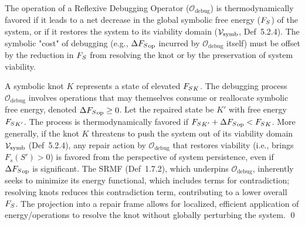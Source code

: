 \begin{theorem}
\label{theorem:bk8_observer_projection_tensor}
The operation of a Reflexive Debugging Operator ($\mathcal{O}_{\text{debug}}$) is thermodynamically favored if it leads to a net decrease in the global symbolic free energy ($F_S$) of the system, or if it restores the system to its viability domain ($\mathcal{V}_{\mathrm{symb}}$, Def~5.2.4). The symbolic "cost" of debugging (e.g., $\Delta {F_S}_{\text{op}}$ incurred by $\mathcal{O}_{\text{debug}}$ itself) must be offset by the reduction in $F_S$ from resolving the knot or by the preservation of system viability.
\end{theorem}
\begin{demonstratio}
\label{demonstratio:bk8_symbolic_unkotting}
A symbolic knot $K$ represents a state of elevated ${F_S}_K$. The debugging process $\mathcal{O}_{\text{debug}}$ involves operations that may themselves consume or reallocate symbolic free energy, denoted $\Delta {F_S}_{\text{op}} \ge 0$. Let the repaired state be $K'$ with free energy ${F_S}_{K'}$. The process is thermodynamically favored if ${F_S}_{K'} + \Delta {F_S}_{\text{op}} < {F_S}_K$.
More generally, if the knot $K$ threatens to push the system out of its viability domain $\mathcal{V}_{\mathrm{symb}}$ (Def~5.2.4), any repair action by $\mathcal{O}_{\text{debug}}$ that restores viability (i.e., brings $F_s(S') > 0$) is favored from the perspective of system persistence, even if $\Delta {F_S}_{\text{op}}$ is significant.
The SRMF (Def~1.7.2), which underpins $\mathcal{O}_{\text{debug}}$, inherently seeks to minimize its energy functional, which includes terms for contradiction; resolving knots reduces this contradiction term, contributing to a lower overall ${F_S}$. The projection into a repair frame allows for localized, efficient application of energy/operations to resolve the knot without globally perturbing the system. \qed
\end{demonstratio}

